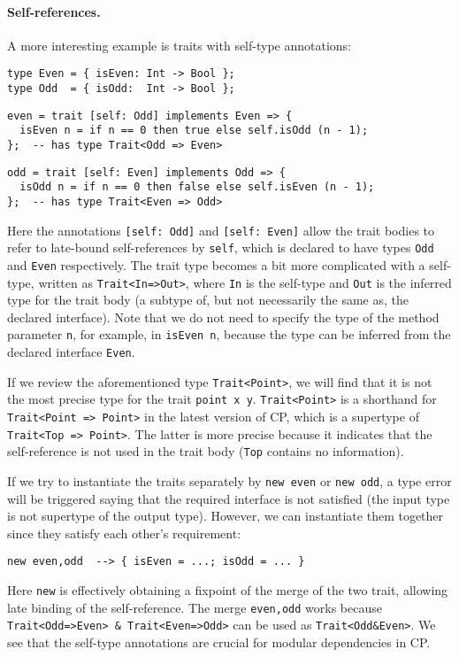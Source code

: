 \paragraph{Self-references.}
A more interesting example is traits with self-type annotations:
\begin{lstlisting}
type Even = { isEven: Int -> Bool };
type Odd  = { isOdd:  Int -> Bool };
\end{lstlisting}
\vspace{-1ex}
\begin{lstlisting}
even = trait [self: Odd] implements Even => {
  isEven n = if n == 0 then true else self.isOdd (n - 1);
};  -- has type Trait<Odd => Even>
\end{lstlisting}
\vspace{-1ex}
\begin{lstlisting}
odd = trait [self: Even] implements Odd => {
  isOdd n = if n == 0 then false else self.isEven (n - 1);
};  -- has type Trait<Even => Odd>
\end{lstlisting}
Here the annotations \lstinline{[self: Odd]} and \lstinline{[self: Even]} allow
the trait bodies to refer to late-bound self-references by \lstinline{self},
which is declared to have types \lstinline{Odd} and \lstinline{Even}
respectively. The trait type becomes a bit more complicated with a self-type,
written as \lstinline{Trait<In=>Out>}, where \lstinline{In} is the self-type and
\lstinline{Out} is the inferred type for the trait body (a subtype of, but not
necessarily the same as, the declared interface). Note that we do not need to
specify the type of the method parameter \lstinline{n}, for example, in
\lstinline{isEven n}, because the type can be inferred from the declared
interface \lstinline{Even}.

\begin{tipblock}
If we review the aforementioned type \lstinline{Trait<Point>}, we will find that
it is not the most precise type for the trait \lstinline{point x y}.
\lstinline{Trait<Point>} is a shorthand for \lstinline{Trait<Point => Point>} in
the latest version of CP, which is a supertype of \lstinline{Trait<Top => Point>}.
The latter is more precise because it indicates that the self-reference is not
used in the trait body (\lstinline{Top} contains no information).
\end{tipblock}

\noindent
If we try to instantiate the traits separately by \lstinline{new even} or
\lstinline{new odd}, a type error will be triggered saying that the required
interface is not satisfied (the input type is not supertype of the output type).
However, we can instantiate them together since they satisfy each other's
requirement:
\begin{lstlisting}
new even,odd  --> { isEven = ...; isOdd = ... }
\end{lstlisting}
Here \lstinline{new} is effectively obtaining a fixpoint of the merge of the two
trait, allowing late binding of the self-reference. The merge
\lstinline{even,odd} works because \lstinline{Trait<Odd=>Even> & Trait<Even=>Odd>}
can be used as \lstinline{Trait<Odd&Even>}. We see that the self-type annotations
are crucial for modular dependencies in CP.

